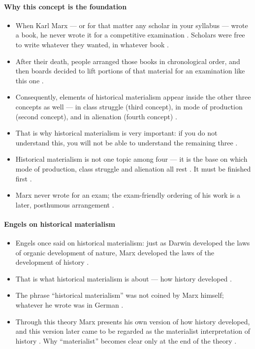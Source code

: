 \paragraph{Why this concept is the foundation}
\begin{itemize}
    \item When Karl Marx --- or for that matter any scholar in your syllabus --- wrote a book, he never wrote it for a competitive examination . Scholars were free to write whatever they wanted, in whatever book .
    \item After their death, people arranged those books in chronological order, and then boards decided to lift portions of that material for an examination like this one .
    \item Consequently, elements of historical materialism appear inside the other three concepts as well --- in class struggle (third concept), in mode of production (second concept), and in alienation (fourth concept) .
    \item That is why historical materialism is very important: if you do not understand this, you will not be able to understand the remaining three .
\end{itemize}

\begin{CriticalPoint}
\begin{itemize}
    \item Historical materialism is not one topic among four --- it is the base on which mode of production, class struggle and alienation all rest . It must be finished first .
    \item Marx never wrote for an exam; the exam-friendly ordering of his work is a later, posthumous arrangement .
\end{itemize}
\end{CriticalPoint}

\paragraph{Engels on historical materialism}
\begin{itemize}
    \item Engels once said on historical materialism: just as Darwin developed the laws of organic development of nature, Marx developed the laws of the development of history .
    \item That is what historical materialism is about --- how history developed .
    \item The phrase ``historical materialism'' was not coined by Marx himself; whatever he wrote was in German .
    \item Through this theory Marx presents his own version of how history developed, and this version later came to be regarded as the materialist interpretation of history . Why ``materialist'' becomes clear only at the end of the theory .
\end{itemize}

